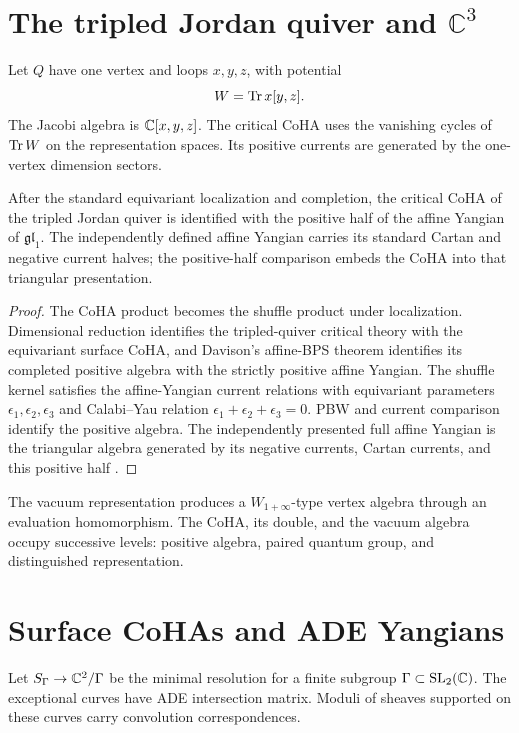 \chapter{The tripled Jordan quiver and \texorpdfstring{$\mathbb C^3$}{C3}}
Let $Q$ have one vertex and loops $x,y,z$, with potential
\[
 W=\operatorname{Tr} x[y,z].
\]
The Jacobi algebra is $\mathbb C[x,y,z]$. The critical CoHA uses the vanishing cycles of $\operatorname{Tr} W$ on the representation spaces. Its positive currents are generated by the one-vertex dimension sectors.

\begin{theorem}
After the standard equivariant localization and completion, the critical CoHA of the tripled Jordan quiver is identified with the positive half of the affine Yangian of $\mathfrak{gl}_1$. The independently defined affine Yangian carries its standard Cartan and negative current halves; the positive-half comparison embeds the CoHA into that triangular presentation.
\end{theorem}
\begin{proof}
The CoHA product becomes the shuffle product under localization. Dimensional reduction identifies the tripled-quiver critical theory with the equivariant surface CoHA, and Davison's affine-BPS theorem identifies its completed positive algebra with the strictly positive affine Yangian. The shuffle kernel satisfies the affine-Yangian current relations with equivariant parameters $\epsilon_1,\epsilon_2,\epsilon_3$ and Calabi--Yau relation $\epsilon_1+\epsilon_2+\epsilon_3=0$. PBW and current comparison identify the positive algebra. The independently presented full affine Yangian is the triangular algebra generated by its negative currents, Cartan currents, and this positive half \cite{DavisonAffineBPS,DavisonMeinhardt,SVYangians,Tsymbaliuk}.
\end{proof}

The vacuum representation produces a $W_{1+\infty}$-type vertex algebra through an evaluation homomorphism. The CoHA, its double, and the vacuum algebra occupy successive levels: positive algebra, paired quantum group, and distinguished representation.

\chapter{Surface CoHAs and ADE Yangians}
Let $S_\Gamma\to\mathbb C^2/\Gamma$ be the minimal resolution for a finite subgroup $\Gamma\subset\operatorname{SL}_2(\mathbb C)$. The exceptional curves have ADE intersection matrix. Moduli of sheaves supported on these curves carry convolution correspondences.

